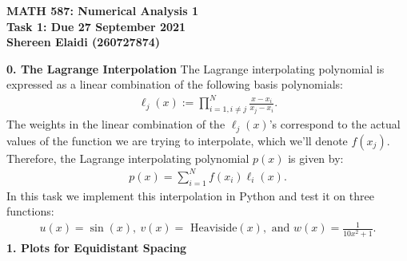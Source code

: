 \documentclass[11pt]{article}
\theoremstyle{definition}
\theoremstyle{theorem}
\begin{document}
\begin{center}
	\textbf{MATH 587: Numerical Analysis 1} \\
	\textbf{Task 1: Due 27 September 2021} \\
	\textbf{Shereen Elaidi (260727874)}
\end{center}
\textbf{0. The Lagrange Interpolation}
\newline
The Lagrange interpolating polynomial is expressed as a linear combination of the following basis polynomials: 
\begin{align*}
	\ell_j(x) := \prod_{i = 1, i\neq j}^N \frac{x-x_i}{x_j -x_i}.
\end{align*}
The weights in the linear combination of the \( \ell_j(x) \)'s correspond to the actual values of the function we are trying to interpolate, which we'll denote \( f(x_j) \). Therefore, the Lagrange interpolating polynomial \( p(x) \) is given by: 
\begin{align*}
	p(x) = \sum_{i=1}^N f(x_i) \ell_i(x).
\end{align*}
In this task we implement this interpolation in Python and test it on three functions:
\begin{align*}
u(x) = \sin(x),\ v(x) = \text{ Heaviside}(x), \text{ and } w(x) = \frac{1}{10x^2 + 1}.
\end{align*}
\textbf{1. Plots for Equidistant Spacing}
\end{document}
